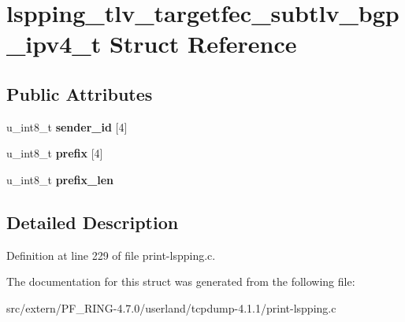 \hypertarget{structlspping__tlv__targetfec__subtlv__bgp__ipv4__t}{
\section{lspping\_\-tlv\_\-targetfec\_\-subtlv\_\-bgp\_\-ipv4\_\-t Struct Reference}
\label{structlspping__tlv__targetfec__subtlv__bgp__ipv4__t}
}
\subsection*{Public Attributes}
\begin{DoxyCompactItemize}
\item 
\hypertarget{structlspping__tlv__targetfec__subtlv__bgp__ipv4__t_a6e894645237d8a95d75fd17b2081f5a4}{
u\_\-int8\_\-t {\bfseries sender\_\-id} \mbox{[}4\mbox{]}}
\label{structlspping__tlv__targetfec__subtlv__bgp__ipv4__t_a6e894645237d8a95d75fd17b2081f5a4}

\item 
\hypertarget{structlspping__tlv__targetfec__subtlv__bgp__ipv4__t_a5b7d6bb638f348457ff4fa5432ee20ba}{
u\_\-int8\_\-t {\bfseries prefix} \mbox{[}4\mbox{]}}
\label{structlspping__tlv__targetfec__subtlv__bgp__ipv4__t_a5b7d6bb638f348457ff4fa5432ee20ba}

\item 
\hypertarget{structlspping__tlv__targetfec__subtlv__bgp__ipv4__t_a16a249c771994a17baa724374c48cdae}{
u\_\-int8\_\-t {\bfseries prefix\_\-len}}
\label{structlspping__tlv__targetfec__subtlv__bgp__ipv4__t_a16a249c771994a17baa724374c48cdae}

\end{DoxyCompactItemize}


\subsection{Detailed Description}


Definition at line 229 of file print-\/lspping.c.



The documentation for this struct was generated from the following file:\begin{DoxyCompactItemize}
\item 
src/extern/PF\_\-RING-\/4.7.0/userland/tcpdump-\/4.1.1/print-\/lspping.c\end{DoxyCompactItemize}
